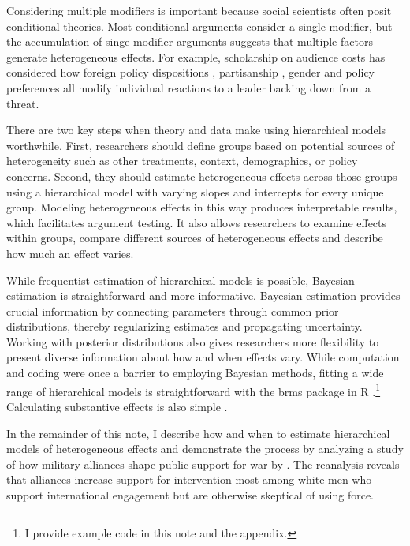 \documentclass[12pt]{article}
\begin{document}
Considering multiple modifiers is important because social scientists often posit conditional theories.
Most conditional arguments consider a single modifier, but the accumulation of singe-modifier arguments suggests that multiple factors generate heterogeneous effects.
For example, scholarship on audience costs has considered how foreign policy dispositions \citep{KertzerBrutger2016}, partisanship \citep{LevenduskyHorowitz2012}, gender \citep{Barnhartetal2020, SchwartzBlair2020} and policy preferences \citep{Chaudoin2014} all modify individual reactions to a leader backing down from a threat. 



There are two key steps when theory and data make using hierarchical models worthwhile.
First, researchers should define groups based on potential sources of heterogeneity such as other treatments, context, demographics, or policy concerns. 
Second, they should estimate heterogeneous effects across those groups using a hierarchical model with varying slopes and intercepts for every unique group. 
Modeling heterogeneous effects in this way produces interpretable results, which facilitates argument testing.
It also allows researchers to examine effects within groups, compare different sources of heterogeneous effects and describe how much an effect varies.  


While frequentist estimation of hierarchical models is possible, Bayesian estimation is straightforward and more informative.
Bayesian estimation provides crucial information by connecting parameters through common prior distributions, thereby regularizing estimates and propagating uncertainty. 
Working with posterior distributions also gives researchers more flexibility to present diverse information about how and when effects vary. 
While computation and coding were once a barrier to employing Bayesian methods, fitting a wide range of hierarchical models is straightforward with the brms package in \textsf{R} \citep{Buerkner2017}.\footnote{I provide example code in this note and the appendix.}
Calculating substantive effects is also simple \citep{ArelBundockme}.



In the remainder of this note, I describe how and when to estimate hierarchical models of heterogeneous effects and demonstrate the process by analyzing a study of how military alliances shape public support for war by \citet{TomzWeeks2021}. 
The reanalysis reveals that alliances increase support for intervention most among white men who support international engagement but are otherwise skeptical of using force. 
\end{document}
